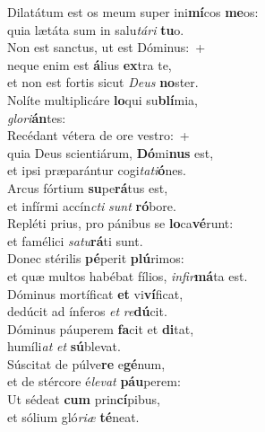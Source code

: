 \evenverse Dilatátum est os meum super ini\textbf{mí}cos \textbf{me}os:~\*\\
\evenverse quia lætáta sum in salu\textit{tá}\textit{ri} \textbf{tu}o.\\
\oddverse Non est sanctus, ut est Dóminus:~+\\
\oddverse  neque enim est \textbf{á}lius \textbf{ex}tra te,~\*\\
\oddverse et non est fortis sicut \textit{De}\textit{us} \textbf{no}ster.\\
\evenverse Nolíte multiplicáre \textbf{lo}qui su\textbf{blí}mia,~\*\\
\evenverse \textit{glo}\textit{ri}\textbf{án}tes:\\
\oddverse Recédant vétera de ore vestro:~+\\
\oddverse  quia Deus scientiárum, \textbf{Dó}mi\textbf{nus} est,~\*\\
\oddverse et ipsi præparántur cogi\textit{ta}\textit{ti}\textbf{ó}nes.\\
\evenverse Arcus fórtium \textbf{su}pe\textbf{rá}tus est,~\*\\
\evenverse et infírmi accín\textit{cti} \textit{sunt} \textbf{ró}bore.\\
\oddverse Repléti prius, pro pánibus se \textbf{lo}ca\textbf{vé}runt:~\*\\
\oddverse et famélici \textit{sa}\textit{tu}\textbf{rá}ti sunt.\\
\evenverse Donec stérilis \textbf{pé}perit \textbf{plú}rimos:~\*\\
\evenverse et quæ multos habébat fílios, \textit{in}\textit{fir}\textbf{má}ta est.\\
\oddverse Dóminus mortíficat \textbf{et} vi\textbf{ví}ficat,~\*\\
\oddverse dedúcit ad ínferos \textit{et} \textit{re}\textbf{dú}cit.\\
\evenverse Dóminus páuperem \textbf{fa}cit et \textbf{di}tat,~\*\\
\evenverse humíli\textit{at} \textit{et} \textbf{sú}blevat.\\
\oddverse Súscitat de púlve\textbf{re} e\textbf{gé}num,~\*\\
\oddverse et de stércore é\textit{le}\textit{vat} \textbf{páu}perem:\\
\evenverse Ut sédeat \textbf{cum} prin\textbf{cí}pibus,~\*\\
\evenverse et sólium gló\textit{ri}\textit{æ} \textbf{té}neat.\\
